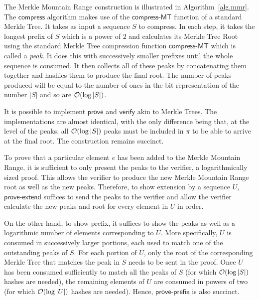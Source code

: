 The Merkle Mountain Range construction is illustrated in
Algorithm~\ref{alg.mmr}. The $\textsf{compress}$ algorithm makes use of the
$\textsf{compress-MT}$ function of a standard Merkle Tree. It takes as input a
sequence $S$ to compress. In each step, it
takes the longest prefix of $S$ which is a power of $2$ and calculates its
Merkle Tree Root using the standard Merkle Tree compression function
$\textsf{compress-MT}$ which is called a \emph{peak}. It does this with
successively smaller prefixes until the whole sequence is consumed. It then
collects all of these peaks by concatenating them together and hashies them to
produce the final root. The number of peaks produced will be equal to the number
of ones in the bit representation of the number $|S|$ and so are
$\mathcal{O}(\log|S|)$.



It is possible to implement $\textsf{prove}$ and $\textsf{verify}$ akin to
Merkle Trees. The implementations are almost identical, with the only difference
being that, at the level of the peaks, all $\mathcal{O}(\log|S|)$ peaks must be
included in $\pi$ to be able to arrive at the final root. The construction
remains succinct.

To prove that a particular element $e$ has been added to the Merkle Mountain
Range, it is sufficient to only present the peaks to the verifier, a
logarithmically sized proof. This allows the verifier to produce the new Merkle
Mountain Range root as well as the new peaks. Therefore, to show extension by a
sequence $U$, $\textsf{prove-extend}$ suffices to send the peaks to the verifier
and allow the verifier calculate the new peaks and root for every element in $U$
in order.

On the other hand, to show prefix, it suffices to show the peaks as
well as a logarithmic number of elements corresponding to $U$. More
specifically, $U$ is consumed in successively larger portions, each used to
match one of the outstanding peaks of $S$. For each portion of $U$, only the
root of the corresponding Merkle Tree that matches the peak in $S$ needs to be
sent in the proof. Once $U$ has been consumed sufficiently to match all the
peaks of $S$ (for which $\mathcal{O}(\log|S|)$ hashes are needed), the remaining elements of
$U$ are consumed in powers of two (for which $\mathcal{O}(\log|U|)$ hashes are
needed). Hence, $\textsf{prove-prefix}$ is also succinct.

